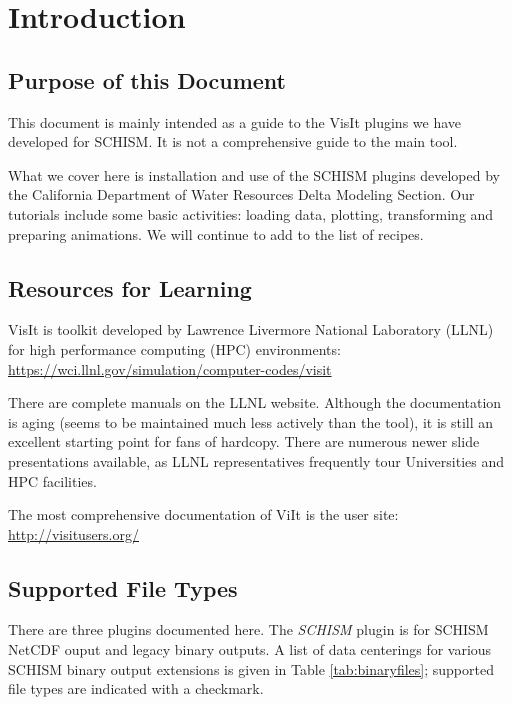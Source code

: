 \documentclass[12pt]{report}
\begin{document}
\lstset{basicstyle=\ttfamily\tiny}

\chapter{Introduction}
\section{Purpose of this Document}
This document is mainly intended as a guide to the VisIt plugins we have developed for SCHISM. 
It is not a comprehensive guide to the main tool.

What we cover here is installation and use of the SCHISM plugins developed by the California Department of Water Resources Delta Modeling Section. Our tutorials include some basic activities: loading data, plotting,
transforming and preparing animations. We will continue to add to the list of recipes. 

\section{Resources for Learning}
VisIt is toolkit developed by Lawrence Livermore National Laboratory (LLNL) for high performance computing (HPC) environments:
\url{https://wci.llnl.gov/simulation/computer-codes/visit}

There are complete manuals on the LLNL website. Although the documentation is aging (seems to be maintained much less actively than the tool), it is still an excellent starting point for fans of hardcopy. There are numerous newer slide presentations available, as LLNL representatives frequently tour Universities and HPC facilities.

The most comprehensive documentation of ViIt is the user site:\\
\url{http://visitusers.org/}

\section{Supported File Types}
There are three plugins documented here. The \emph{SCHISM} plugin is for SCHISM NetCDF ouput and legacy binary outputs. A list of data centerings for various SCHISM binary output extensions is given in Table \ref{tab:binaryfiles}; supported file types are indicated with a checkmark.
\end{document}
